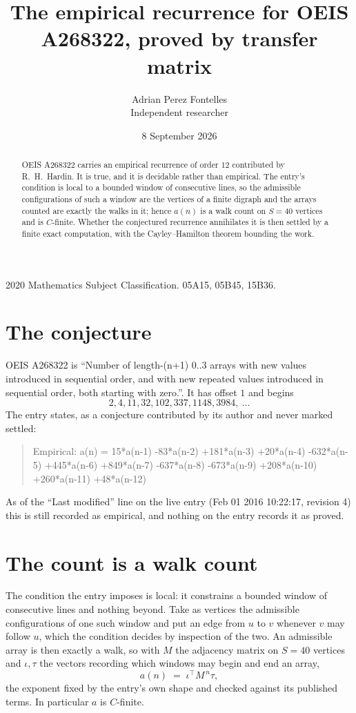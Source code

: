\documentclass[11pt,a4paper]{article}
\title{The empirical recurrence for OEIS A268322, proved by transfer matrix}
\author{Adrian Perez Fontelles\\ \small Independent researcher}
\date{8 September 2026}
\theoremstyle{plain}
\theoremstyle{definition}
\begin{document}
\maketitle

\begin{abstract}
OEIS A268322 carries an empirical recurrence of order $12$ contributed by R.~H.~Hardin. It is
true, and it is decidable rather than empirical. The entry's condition is local to a bounded window of consecutive lines, so
the admissible configurations of such a window are the vertices of a finite digraph and the
arrays counted are exactly the walks in it; hence $a(n)$ is a walk count on $S=40$ vertices
and is $C$-finite. Whether the conjectured recurrence annihilates it is then settled by a
finite exact computation, with the Cayley--Hamilton theorem bounding the work.
\end{abstract}

\noindent\small 2020 Mathematics Subject Classification. 05A15, 05B45, 15B36.\normalsize

\section{The conjecture}

OEIS A268322 is ``Number of length-(n+1) 0..3 arrays with new values introduced in sequential order, and with new repeated values introduced in sequential order, both starting with zero.''. It has offset $1$ and begins
\[
2, 4, 11, 32, 102, 337, 1148, 3984,\ \dots
\]
The entry states, as a conjecture contributed by its author and never marked settled:
\begin{quote}
Empirical: a(n) = 15*a(n-1) -83*a(n-2) +181*a(n-3) +20*a(n-4) -632*a(n-5) +445*a(n-6) +849*a(n-7) -637*a(n-8) -673*a(n-9) +208*a(n-10) +260*a(n-11) +48*a(n-12)
\end{quote}
As of the ``Last modified'' line on the live entry (Feb 01 2016 10:22:17, revision 4) this is still
recorded as empirical, and nothing on the entry records it as proved.

\section{The count is a walk count}

The condition the entry imposes is local: it constrains a bounded window of consecutive lines and nothing beyond. Take as
vertices the admissible configurations of one such window and put an edge from $u$ to $v$
whenever $v$ may follow $u$, which the condition decides by inspection of the two. An
admissible array is then exactly a walk, so with $M$ the adjacency matrix on $S=40$ vertices
and $\iota,\tau$ the vectors recording which windows may begin and end an array,
\[
a(n)\;=\;\iota^{\!\top}M^{\,n}\tau ,
\]
the exponent fixed by the entry's own shape and checked against its published terms. In
particular $a$ is $C$-finite.
\end{document}
